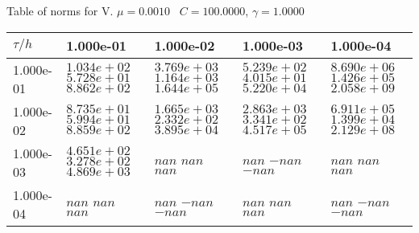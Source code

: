 \begin{center}
Table of norms for V. $\mu = 0.0010$ \, $C = 100.0000$, $\gamma = 1.0000$
  
\begin{tabular}{|p{1in}|p{1in}|p{1in}|p{1in}|p{1in}|} \hline
$\tau / h$ &1.000e-01 &1.000e-02 &1.000e-03 &1.000e-04 \\ \hline 
1.000e-01 & $1.034e+02$  $5.728e+01$  $8.862e+02$  & $3.769e+03$  $1.164e+03$  $1.644e+05$  & $5.239e+02$  $4.015e+01$  $5.220e+04$  & $8.690e+06$  $1.426e+05$  $2.058e+09$  \\ \hline 
1.000e-02 & $8.735e+01$  $5.994e+01$  $8.859e+02$  & $1.665e+03$  $2.332e+02$  $3.895e+04$  & $2.863e+03$  $3.341e+02$  $4.517e+05$  & $6.911e+05$  $1.399e+04$  $2.129e+08$  \\ \hline 
1.000e-03 & $4.651e+02$  $3.278e+02$  $4.869e+03$  & $nan$  $nan$  $nan$  & $nan$  $-nan$  $-nan$  & $nan$  $nan$  $nan$  \\ \hline 
1.000e-04 & $nan$  $nan$  $nan$  & $nan$  $-nan$  $-nan$  & $nan$  $nan$  $nan$  & $nan$  $-nan$  $-nan$  \\ \hline 

\end{tabular}\\[20pt]
\end{center}
